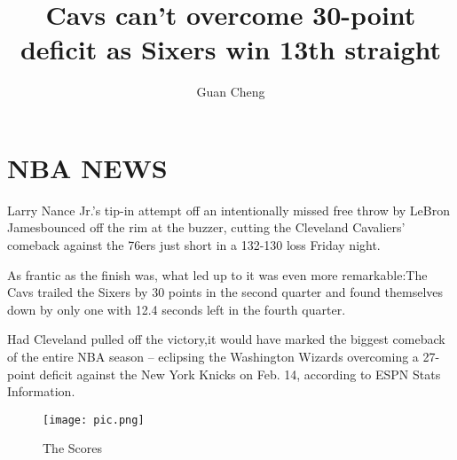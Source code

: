 \documentclass[UTF8]{article}
\author {Guan Cheng}
\title {Cavs can't overcome 30-point deficit as Sixers win 13th straight}
\begin{document}
\maketitle
\section{NBA NEWS}
     Larry Nance Jr.'s tip-in attempt off an intentionally missed free throw by LeBron Jamesbounced off the rim at the buzzer,
 cutting the Cleveland Cavaliers' comeback against the 76ers just short in a 132-130 loss Friday night.

     As frantic as the finish was, what led up to it was even more remarkable:The Cavs trailed the Sixers by 30 points in the second quarter
and found themselves down by only one with 12.4 seconds left in the fourth quarter.

     Had Cleveland pulled off the victory,it would have marked the biggest comeback of the entire NBA season -- eclipsing the Washington Wizards overcoming a 27-point deficit against the New York Knicks on Feb. 14, 
according to ESPN Stats  Information.

\begin{figure}[ht]
  \centering
  \texttt{[image: pic.png]}
  \caption{The Scores}
\end{figure}
\end{document}
